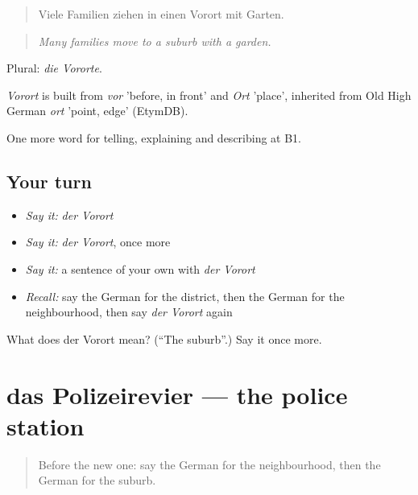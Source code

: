 \begin{quote}
Viele Familien ziehen in einen Vorort mit Garten.
\end{quote}

\begin{quote}
\emph{Many families move to a suburb with a garden.}
\end{quote}

Plural: \emph{die Vororte}.

\begin{cousinweb}
\emph{Vorort} is built from \emph{vor} 'before, in front' and \emph{Ort} 'place', inherited from Old High German \emph{ort} 'point, edge' (EtymDB).
\end{cousinweb}

\begin{grammarlens}[title={What you've built}]
One more word for telling, explaining and describing at B1.
\end{grammarlens}

\subsection*{Your turn}
\begin{itemize}
\raggedright
  \item \emph{Say it:} \emph{der Vorort}
  \item \emph{Say it:} \emph{der Vorort}, once more
  \item \emph{Say it:} a sentence of your own with \emph{der Vorort}
  \item \emph{Recall:} say the German for the district, then the German for the neighbourhood, then say \emph{der Vorort} again
\end{itemize}

\begin{tcolorbox}[breakable,colback=teal!4,colframe=teal!35!black,title={Before you move on}]
What does der Vorort mean? (\textquotedblleft{}The suburb\textquotedblright{}.) Say it once more.
\end{tcolorbox}
\section[das Polizeirevier]{das Polizeirevier — the police station}

\label{lesson:GE-C439-polizeirevier}



\begin{quote}
Before the new one: say the German for the neighbourhood, then the German for the suburb.
\end{quote}

